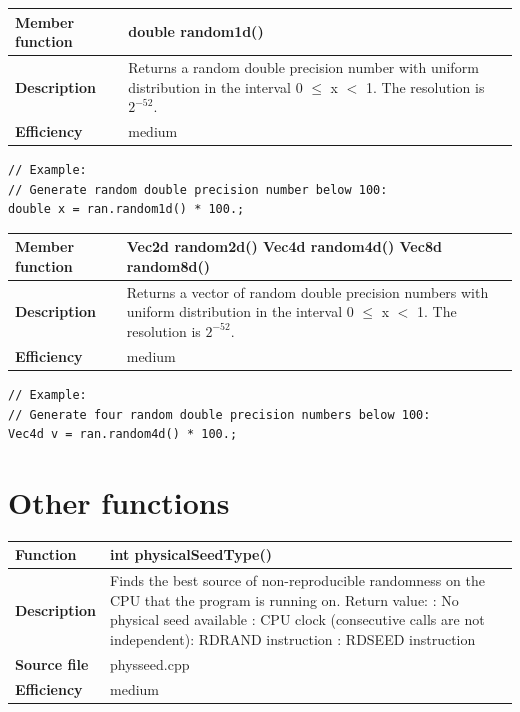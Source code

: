 \documentclass[11pt,a4paper,oneside,openright]{report}
\newcommand{\vspacesmall}{\vspace{3mm}}
\newcommand{\vspacebig}{\vspace{6mm}}
\begin{document}
\begin{tabular}{|p{30mm}|p{100mm}|}
\hline
\bfseries Member function & double random1d() \\ \hline
\bfseries Description & Returns a random double precision number with uniform distribution in the interval 0 $\leq$ x $<$ 1. The resolution is $2^{-52}$. \\ \hline
\bfseries Efficiency & medium \\ \hline
\end{tabular}
\begin{lstlisting}[frame=none]
// Example:
// Generate random double precision number below 100:
double x = ran.random1d() * 100.;
\end{lstlisting}
\vspacesmall

\begin{tabular}{|p{30mm}|p{100mm}|}
\hline
\bfseries Member function & Vec2d random2d() \newline
Vec4d random4d() \newline
Vec8d random8d() \\ \hline
\bfseries Description & Returns a vector of random double precision numbers with uniform distribution in the interval 0 $\leq$ x $<$ 1. The resolution is $2^{-52}$.  \\ \hline
\bfseries Efficiency & medium \\ \hline
\end{tabular}
\begin{lstlisting}[frame=none]
// Example:
// Generate four random double precision numbers below 100:
Vec4d v = ran.random4d() * 100.;
\end{lstlisting}
\vspacebig


\section{Other functions}\label{OtherFunctions}

\begin{tabular}{|p{30mm}|p{100mm}|}
\hline
\bfseries Function & int physicalSeedType()  \\ \hline
\bfseries Description & Finds the best source of non-reproducible randomness on the CPU that the program is running on. Return value: \newline
0:  No physical seed available \newline
1:  CPU clock (consecutive calls are not independent)\newline
2:  RDRAND instruction \newline
3:  RDSEED instruction   \\ \hline
\bfseries Source file & physseed.cpp \\ \hline
\bfseries Efficiency & medium \\ \hline
\end{tabular}
\vspacebig
\end{document}
